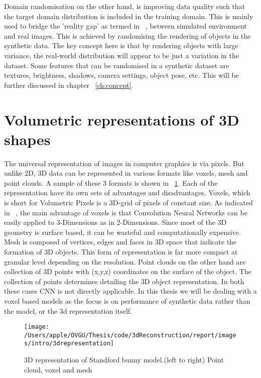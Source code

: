 Domain randomisation on the other hand, is improving data quality such that the target domain distribution is included in the training domain.
This is mainly used to bridge the 'reality gap' as termed in ~\cite{tobin2017domain}, between simulated environment and real images.
This is achieved by randomising the rendering of objects in the synthetic data.
The key concept here is that by rendering objects with large variance, the real-world distribution will appear to be just a variation in the dataset.
Some features that can be randomised in a synthetic dataset are textures, brightness, shadows, camera settings, object pose, etc.
This will be further discussed in chapter ~\ref{ch:concept}.


\section{Volumetric representations of 3D shapes} \label{sec:Volumetric representation}
The universal representation of images in computer graphics is via pixels.
But unlike 2D, 3D data can be represented in various formats like voxels, mesh and point clouds.
A sample of these 3 formats is shown in ~\ref{fig:3d representation}.
Each of the representation have its own sets of advantages and disadvantages.
Voxels, which is short for Volumetric Pixels is a 3D-grid of pixels of constant size.
As indicated in ~\cite{li2016fpnn}, the main advantage of voxels is that Convolution Neural Networks can be easily applied to 3-Dimensions as in 2-Dimensions.
Since most of the 3D geometry is surface based, it can be wasteful and computationally expensive.
Mesh is composed of vertices, edges and faces in 3D space that indicate the formation of 3D objects.
This form of representation is far more compact at granular level depending on the resolution.
Point clouds on the other hand are collection of 3D points with (x,y,z) coordinates on the surface of the object.
The collection of points determines detailing the 3D object representation.
In both these cases CNN is not directly applicable.
In this thesis we will be dealing with a voxel based models as the focus is on performance of synthetic data rather than the model, or the 3d representation itself.

\begin{figure}
    \centering
    \texttt{[image: /Users/apple/OVGU/Thesis/code/3dReconstruction/report/images/intro/3drepresentation]}
    \caption{3D representation of Standford bunny model.(left to right) Point cloud, voxel and mesh ~\cite{Hoang2019ADL}
    \label{fig:3d representation}}
\end{figure}


